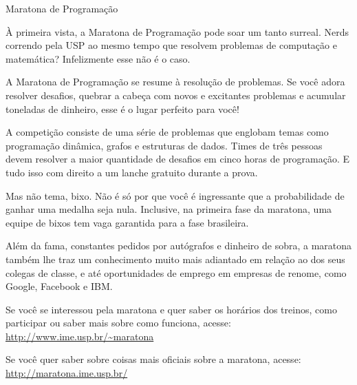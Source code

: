 \begin{secao}{Maratona de Programação}

À primeira vista, a Maratona de Programação pode soar um tanto
surreal. Nerds correndo pela USP ao mesmo tempo que resolvem
problemas de computação e matemática? Infelizmente esse não
é o caso.

A Maratona de Programação se resume à resolução de problemas.
Se você adora resolver desafios, quebrar a cabeça com novos
e excitantes problemas e acumular toneladas de dinheiro, esse
é o lugar perfeito para você!

A competição consiste de uma série de problemas que englobam
temas como programação dinâmica, grafos e estruturas de dados.
Times de três pessoas devem resolver a maior quantidade de
desafios em cinco horas de programação. E tudo isso com direito
a um lanche gratuito durante a prova.

Mas não tema, bixo. Não é só por que você é ingressante que
a probabilidade de ganhar uma medalha seja nula. Inclusive, na primeira 
fase da maratona, uma equipe de bixos tem vaga garantida para a 
fase brasileira.

Além da fama, constantes pedidos por autógrafos e dinheiro de sobra,
a maratona também lhe traz um conhecimento muito mais 
adiantado em relação ao dos seus colegas de classe, e até oportunidades
de emprego em empresas de renome, como Google, Facebook e IBM.

Se você se interessou pela maratona e quer saber os horários dos
treinos, como participar ou saber mais sobre como funciona, acesse: 
\url{http://www.ime.usp.br/~maratona}

Se você quer saber sobre coisas mais oficiais sobre a maratona, acesse:
\url{http://maratona.ime.usp.br/}

\end{secao}
